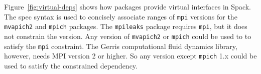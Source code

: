 Figure~\ref{fig:virtual-deps} shows how packages provide
virtual interfaces in Spack.  The spec syntax is used to concisely
associate ranges of {\tt mpi} versions for the {\tt mvapich2} and {\tt mpich} packages.
The {\tt mpileaks} package requires {\tt mpi}, but it does not constrain the version.
Any version of {\tt mvapich2} or {\tt mpich} could be used to to satisfy the {\tt mpi}
constraint. The Gerris computational fluid dynamics library, however, needs MPI version 2 or higher.  So any
version except {\tt mpich} 1.x could be used to satisfy the constrained dependency.


